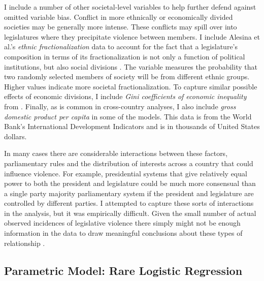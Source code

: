 \documentclass[a4paper]{article}\usepackage{graphicx, color}
\begin{document}
I include a number of other societal-level variables to help further defend against omitted variable bias. Conflict in more ethnically or economically divided societies may be generally more intense. These conflicts may spill over into legislatures where they precipitate violence between members. I include Alesina et al.'s \citeyearpar{Alesina2003} {\emph{ethnic fractionalization}} data to account for the fact that a legislature's composition in terms of its fractionalization is not only a function of political institutions, but also social divisions \citep{Neto1997, Mozaffar2003}. The variable measures the probability that two randomly selected members of society will be from different ethnic groups. Higher values indicate more societal fractionalization. To capture similar possible effects of economic divisions, I include {\emph{Gini coefficients of economic inequality}} from \cite{UNU2008}. Finally, as is common in cross-country analyses, I also include {\emph{gross domestic product per capita}} in some of the models. This data is from the World Bank's International Development Indicators \citeyearpar{WorldBank2011} and is in thousands of United States dollars.

In many cases there are considerable interactions between these factors, parliamentary rules and the distribution of interests across a country that could influence violence. For example, presidential systems that give relatively equal power to both the president and legislature could be much more consensual than a single party majority parliamentary system if the president and legislature are controlled by different parties. I attempted to capture these sorts of interactions in the analysis, but it was empirically difficult. Given the small number of actual observed incidences of legislative violence there simply might not be enough information in the data to draw meaningful conclusions about these types of relationship \citep[see][]{Brambor2006}.

\subsection{Parametric Model: Rare Logistic Regression}
\end{document}
